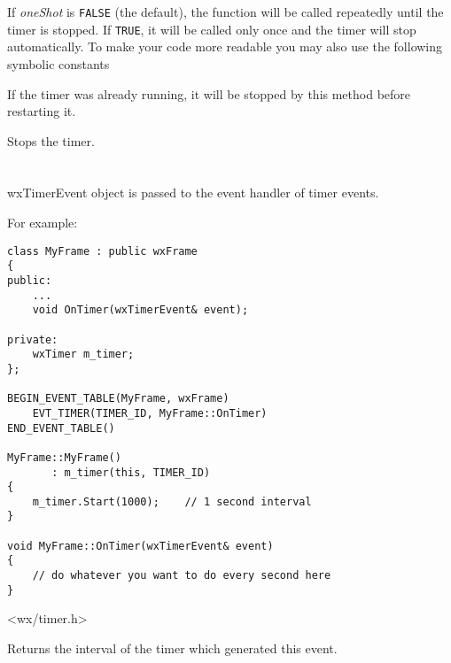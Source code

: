 If {\it oneShot}\/ is {\tt FALSE} (the default), the  
function will be called repeatedly until the timer is stopped. If {\tt TRUE},
it will be called only once and the timer will stop automatically. To make your
code more readable you may also use the following symbolic constants
\twocolwidtha{5cm}%
\begin{twocollist}\itemsep=0pt
\end{twocollist}


If the timer was already running, it will be stopped by this method before
restarting it.

\label{wxtimerstop}


Stops the timer.

\section{}\label{wxtimerevent}

wxTimerEvent object is passed to the event handler of timer events.

For example:

\begin{verbatim}
class MyFrame : public wxFrame
{
public:
    ...
    void OnTimer(wxTimerEvent& event);

private:
    wxTimer m_timer;
};

BEGIN_EVENT_TABLE(MyFrame, wxFrame)
    EVT_TIMER(TIMER_ID, MyFrame::OnTimer)
END_EVENT_TABLE()

MyFrame::MyFrame()
       : m_timer(this, TIMER_ID)
{
    m_timer.Start(1000);    // 1 second interval
}

void MyFrame::OnTimer(wxTimerEvent& event)
{
    // do whatever you want to do every second here
}

\end{verbatim}


<wx/timer.h>




\label{wxtimereventgetinterval}


Returns the interval of the timer which generated this event.

